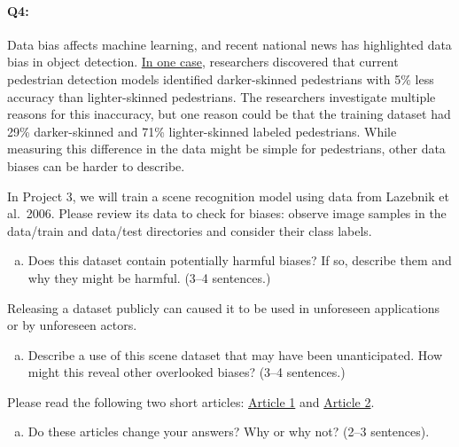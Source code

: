 
\pagebreak
\paragraph{Q4:}
Data bias affects machine learning, and recent national news has highlighted data bias in object detection. \href{https://www.vox.com/future-perfect/2019/3/5/18251924/self-driving-car-racial-bias-study-autonomous-vehicle-dark-skin}{In one case}, researchers discovered that current pedestrian detection models identified darker-skinned pedestrians with 5\% less accuracy than lighter-skinned pedestrians. The researchers investigate multiple reasons for this inaccuracy, but one reason could be that the training dataset had 29\% darker-skinned and 71\% lighter-skinned labeled pedestrians. While measuring this difference in the data might be simple for pedestrians, other data biases can be harder to describe.

In Project 3, we will train a scene recognition model using data from Lazebnik et al.~2006. Please review its data to check for biases: observe image samples in the data/train and data/test directories and consider their class labels.

\begin{enumerate}[(a)]
    \item Does this dataset contain potentially harmful biases? If so, describe them and why they might be harmful. (3--4 sentences.)
\end{enumerate}

Releasing a dataset publicly can caused it to be used in unforeseen applications or by unforeseen actors.

\begin{enumerate}[(b)]
    \item Describe a use of this scene dataset that may have been unanticipated. How might this reveal other overlooked biases? (3--4 sentences.)
\end{enumerate}

Please read the following two short articles: \href{https://www.theverge.com/2019/6/11/18661128/ai-object-recognition-algorithms-bias-worse-household-items-lower-income-countries}{Article 1} and \href{https://arxiv.org/pdf/1711.08536.pdf}{Article 2}.

\begin{enumerate}[(c)]
    \item Do these articles change your answers? Why or why not? (2--3 sentences).
\end{enumerate}


